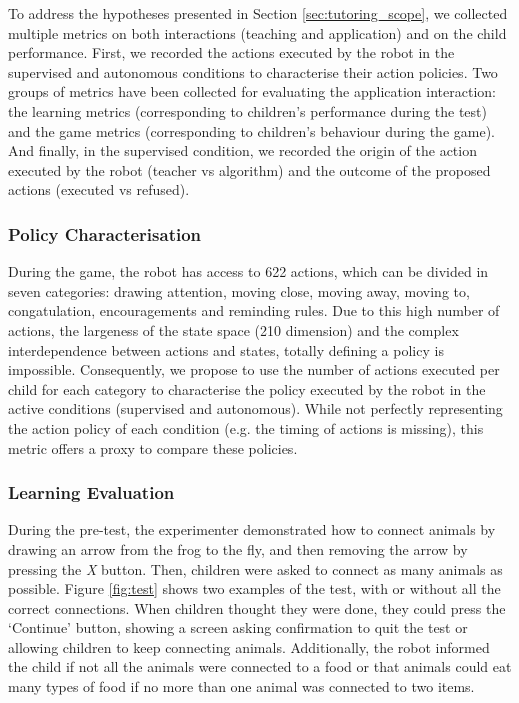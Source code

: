 To address the hypotheses presented in Section \ref{sec:tutoring_scope}, we collected multiple metrics on both interactions (teaching and application) and on the child performance. First, we recorded the actions executed by the robot in the supervised and autonomous conditions to characterise their action policies. Two groups of metrics have been collected for evaluating the application interaction: the learning metrics (corresponding to children's performance during the test) and the game metrics (corresponding to children's behaviour during the game). And finally, in the supervised condition, we recorded the origin of the action executed by the robot (teacher vs algorithm) and the outcome of the proposed actions (executed vs refused).

\subsubsection{Policy Characterisation}

During the game, the robot has access to 622 actions, which can be divided in seven categories: drawing attention, moving close, moving away, moving to, congatulation, encouragements and reminding rules. Due to this high number of actions, the largeness of the state space (210 dimension) and the complex interdependence between actions and states, totally defining a policy is impossible. Consequently, we propose to use the number of actions executed per child for each category to characterise the policy executed by the robot in the active conditions (supervised and autonomous). While not perfectly representing the action policy of each condition (e.g. the timing of actions is missing), this metric offers a proxy to compare these policies. 

\subsubsection{Learning Evaluation}
During the pre-test, the experimenter demonstrated how to connect animals by drawing an arrow from the frog to the fly, and then removing the arrow by pressing the \textit{X} button. Then, children were asked to connect as many animals as possible. Figure \ref{fig:test} shows two examples of the test, with or without all the correct connections. When children thought they were done, they could press the `Continue' button, showing a screen asking confirmation to quit the test or allowing children to keep connecting animals. Additionally, the robot informed the child if not all the animals were connected to a food or that animals could eat many types of food if no more than one animal was connected to two items. 

